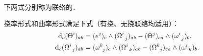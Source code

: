 下两式分别称为联络的．
\begin{theorem}
    挠率形式和曲率形式满足下式（有挠、无挠联络均适用）：
    \begin{subequations}\label{chccr:eqn_Bianchi-C}
    \begin{align}
        {\rm d}_c (\Theta ^{i})_{ab}   &=(e^j)_c \wedge (\Omega_{\hphantom{a} j} ^{i})_{ab}
        -(\Theta ^{j})_{ca} \wedge ( \omega _{\hphantom{a} j}^i )_b , \label{chccr:eqn_Bianchi-CI} \\
        {\rm d}_c (\Omega_{\hphantom{a} j} ^{i})_{ab}  &=  ( \omega _{\hphantom{a} j}^k )_c
        \wedge (\Omega_{\hphantom{a} k} ^{i})_{ab} - (\Omega_{\hphantom{a} j} ^{k})_{ca}\wedge
        ( \omega _{\hphantom{a} k}^i )_b .  \label{chccr:eqn_Bianchi-CII}
    \end{align}
    \end{subequations}
\end{theorem}
